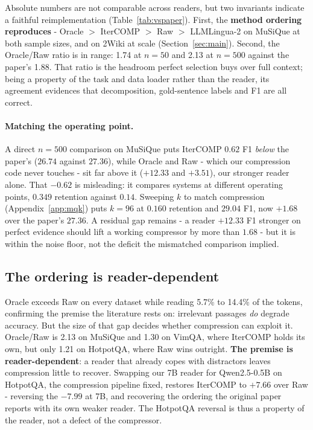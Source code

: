 \documentclass[11pt]{article}
\begin{document}
Absolute numbers are not comparable across readers, but two invariants indicate a
faithful reimplementation (Table~\ref{tab:vspaper}). First, the \textbf{method
ordering reproduces} - Oracle $>$ IterCOMP $>$ Raw $>$ LLMLingua-2 on MuSiQue at
both sample sizes, and on 2Wiki at scale (Section~\ref{sec:main}). Second, the
Oracle/Raw ratio is in range: 1.74 at $n=50$ and 2.13 at $n=500$ against
the paper's 1.88. That ratio is the headroom perfect selection buys over full
context; being a property of the task and data loader rather than the reader, its
agreement evidences that decomposition, gold-sentence labels and F1 are all
correct.

\paragraph{Matching the operating point.} A direct $n=500$ comparison on MuSiQue
puts IterCOMP $0.62$ F1 \emph{below} the paper's ($26.74$ against $27.36$), while
Oracle and Raw - which our compression code never touches - sit far above it
($+12.33$ and $+3.51$), our stronger reader alone. That $-0.62$ is misleading: it
compares systems at different operating points, $0.349$ retention against $0.14$.
Sweeping $k$ to match compression (Appendix~\ref{app:mqk}) puts $k=96$ at $0.160$
retention and $29.04$ F1, now $+1.68$ over the paper's $27.36$. A residual gap
remains - a reader $+12.33$ F1 stronger on perfect evidence should lift a working
compressor by more than $1.68$ - but it is within the noise floor, not the
deficit the mismatched comparison implied.

\subsection{The ordering is reader-dependent}
\label{sec:reader}

Oracle exceeds Raw on every dataset while reading 5.7\% to 14.4\% of the tokens,
confirming the premise the literature rests on: irrelevant passages \emph{do}
degrade accuracy. But the size of that gap decides whether compression can exploit
it. Oracle/Raw is 2.13 on MuSiQue and 1.30 on VimQA, where IterCOMP holds its own,
but only 1.21 on HotpotQA, where Raw wins outright. \textbf{The premise is
reader-dependent}: a reader that already copes with distractors leaves compression
little to recover. Swapping our 7B reader for Qwen2.5-0.5B on HotpotQA, the
compression pipeline fixed, restores IterCOMP to $+7.66$ over Raw - reversing the
$-7.99$ at 7B, and recovering the ordering the original paper reports with its own
weaker reader. The HotpotQA reversal is thus a property of the reader, not a defect
of the compressor.
\end{document}
